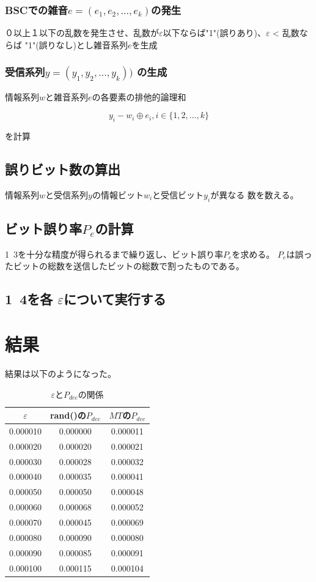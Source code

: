 \documentclass{jsarticle}
\begin{document}
\subsubsection{BSCでの雑音$e= (e_1, e_2, ..., e_k)$の発生}
０以上１以下の乱数を発生させ、乱数が$\varepsilon$以下ならば"1"(誤りあり)、$\varepsilon$ < 乱数ならば
"1"(誤りなし)とし雑音系列$e$を生成


\subsubsection{受信系列$y = (y_1, y_2, ..., y_k))$ の生成}
情報系列$w$と雑音系列$e$の各要素の排他的論理和

$$
y_i - w_i \oplus e_i, i \in \{ 1,2,...,k \}
$$

を計算
\subsection{誤りビット数の算出}
情報系列$w$と受信系列$y$の情報ビット$w_i$と受信ビット$y_i$が異なる
数を数える。

\subsection{ビット誤り率$P_e$の計算}
1~3を十分な精度が得られるまで繰り返し、ビット誤り率$P_e$を求める。
$P_e$は誤ったビットの総数を送信したビットの総数で割ったものである。
\subsection{1~4を各 $\varepsilon$について実行する}


\section{結果}
結果は以下のようになった。

\begin{table}[htb]
  \begin{center}
    \caption{$\varepsilon$と$P_{dec}$の関係}
    \begin{tabular}{|c|c|c|} \hline
      $\varepsilon$ & rand()の$P_{dec}$ & $MT$の$P_{dec}$ \\ \hline
      0.000010 & 0.000000   &  0.000011 \\ \hline
      0.000020 & 0.000020   &  0.000021 \\ \hline
      0.000030 & 0.000028   &  0.000032 \\ \hline
      0.000040 & 0.000035   &  0.000041 \\ \hline
      0.000050 & 0.000050   &  0.000048 \\ \hline
      0.000060 & 0.000068   &  0.000052 \\ \hline
      0.000070 & 0.000045   &  0.000069 \\ \hline
      0.000080 & 0.000090   &  0.000080 \\ \hline
      0.000090 & 0.000085   &  0.000091 \\ \hline
      0.000100 & 0.000115   &  0.000104 \\ \hline
    \end{tabular}
  \end{center}
\end{table}
\end{document}
